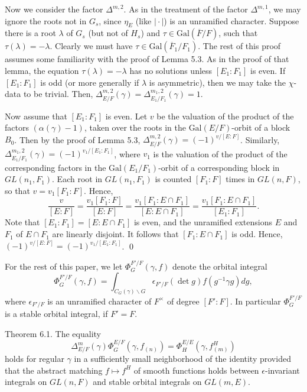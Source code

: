 Now we consider the factor $\Delta^{m,2}$.  As in the treatment
of the factor $\Delta^{m,1}$, we may ignore the roots not
in $G_s$, since $\eta_E$ (like $\mid\cdot\mid$) is an unramified
character.  Suppose there is a root $\lambda$ of $G_s$ (but not of $H_s$)
and $\tau\in \text{Gal}(\overline F/F)$, 
such that $\tau(\lambda) = -\lambda$.  Clearly
we must have $\tau\in\text{Gal}(\overline F_1/F_1)$.  The rest
of this proof assumes some familiarity with the proof of Lemma 5.3.
As in the proof of that lemma,
the equation $\tau(\lambda) =-\lambda$ has no solutions
unless $[E_1:F_1]$ is even.  If $[E_1:F_1]$ is odd (or more generally if
$\lambda$ is asymmetric), then we may take the $\chi$-data to be trivial.
Then, $\Delta^{m,2}_{E/F}(\gamma) = \Delta^{m_1,2}_{E_1/F_1}(\gamma) = 1$.

Now assume that $[E_1:F_1]$ is even.  Let $v$ be the valuation of
the product of the factors $(\alpha(\gamma)-1)$, taken over the
roots in the $\text{Gal}(E/F)$-orbit of a block $B_0$.  Then by the
proof of Lemma 5.3, $\Delta^{m,2}_{E/F}(\gamma) = (-1)^{v/[E:F]}$.
Similarly, $\Delta^{m_1,2}_{E_1/F_1}(\gamma) = (-1)^{v_1/[E_1:F_1]}$,
where $v_1$ is the valuation of the product of the corresponding
factors in the $\text{Gal}(E_1/F_1)$-orbit of a corresponding
block in $GL(n_1,F_1)$.  Each root in $GL(n_1,F_1)$ is counted
$[F_1:F]$ times in $GL(n,F)$, so that $v=v_1[F_1:F]$.
Hence,
$$\frac v {[E:F]} = \frac {v_1[F_1:F]}{[E:F]} =
   \frac {v_1[F_1:E\cap F_1]}{[E:E\cap F_1]} =
   \frac {v_1[F_1:E\cap F_1]}{[E_1:F_1]}.$$
Note that $[E_1:F_1]=[E:E\cap F_1]$  is even, and the unramified
extensions $E$ and $F_1$ of $E\cap F_1$ are linearly disjoint.
It follows that $[F_1:E\cap F_1]$ is odd.  Hence,
$(-1)^{v/[E:F]} = (-1)^{v_1/[E_1:F_1]}$.
\qed
\finishpproclaim

\newpage
\noindent
{}

\medskip
\noindent

For the rest of this paper, we let 
  $ \Phi_G^{F'\!/F}(\gamma,f)$
denote the orbital integral
%
$$
  \Phi_G^{F'\!/F}
  (\gamma,f) =
  \int_{ C_G(\gamma) \backslash G }
  \epsilon_{F'\!/F}
  (\det g) f (g^{-1} \gamma g) dg,
$$
%
where
  $ \epsilon_{F'\!/F} $
is an unramified character of $F^\times$ of degree
  $ [F':F] $.
In particular
  $ \Phi_{G}^{F'\!/F}$
is a stable orbital integral, if $F'=F$.


\medskip
\noindent
\proclaim Theorem {6.1}.
The equality
%
$$
  \Delta_{E/F}^m 
  (\gamma) \Phi_G^{E/F}
  (\gamma, f_{(n)}) =
  \Phi_H^{E/E} (\gamma, f^H_{(m)} )
$$
%
holds for regular
  $ \gamma $
in a sufficiently small neighborhood of the identity provided
  that the abstract matching
  $ f \mapsto f^H $
of smooth functions holds between
  $ \epsilon $-invariant integrals on
  $ GL(n,F) $
and stable orbital integrals on 
  $ GL(m,E) $.
\finishproclaim

